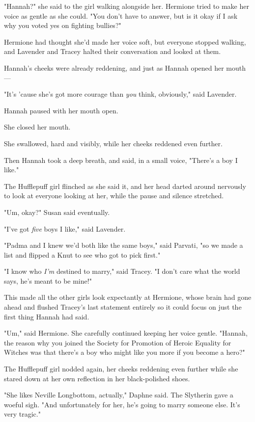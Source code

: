"Hannah?" she said to the girl walking alongside her. Hermione tried to make
her voice as gentle as she could. "You don't have to answer, but is it okay if
I ask why you voted yes on fighting bullies?"

Hermione had thought she'd made her voice soft, but everyone stopped walking,
and Lavender and Tracey halted their conversation and looked at them.

Hannah's cheeks were already reddening, and just as Hannah opened her mouth—

"It's 'cause she's got more courage than \emph{you} think, obviously," said
Lavender.

Hannah paused with her mouth open.

She closed her mouth.

She swallowed, hard and visibly, while her cheeks reddened even further.

Then Hannah took a deep breath, and said, in a small voice, "There's a boy I
like."

The Hufflepuff girl flinched as she said it, and her head darted around
nervously to look at everyone looking at her, while the pause and silence
stretched.

"Um, okay?" Susan said eventually.

"I've got \emph{five} boys I like," said Lavender.

"Padma and I knew we'd both like the same boys," said Parvati, "so we made a
list and flipped a Knut to see who got to pick first."

"I know who \emph{I'm} destined to marry," said Tracey. "I don't care what the
world says, he's meant to be mine!"

This made all the other girls look expectantly at Hermione, whose brain had
gone ahead and flushed Tracey's last statement entirely so it could focus on
just the first thing Hannah had said.

"Um," said Hermione. She carefully continued keeping her voice gentle. "Hannah,
the reason why you joined the Society for Promotion of Heroic Equality for
Witches was that there's a boy who might like you more if you become a hero?"

The Hufflepuff girl nodded again, her cheeks reddening even further while she
stared down at her own reflection in her black-polished shoes.

"She likes Neville Longbottom, actually," Daphne said. The Slytherin gave a
woeful sigh. "And unfortunately for her, he's going to marry someone else. It's
very tragic."


